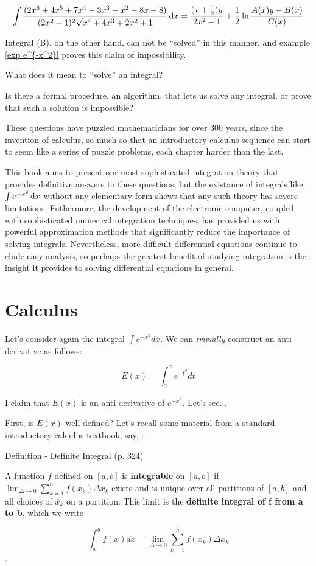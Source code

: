 $$\int {{(2x^6+4x^5+7x^4-3x^3-x^2-8x-8)}\over{(2x^2-1)^2\sqrt{x^4+4 x^3+2 x^2+1}}} \,{\rm d}x
= {{(x+{1\over2})y}\over{2x^2-1}} + {1\over2}\ln{{A(x)y - B(x)}\over{C(x)}}
$$

Integral (B), on the other hand, can not be ``solved'' in
this manner, and example \ref{exp e^{-x^2}} proves this
claim of impossibility.

What does it mean to ``solve'' an integral?

Is there a formal procedure, an algorithm, that lets us solve
any integral, or prove that such a solution is impossible?

These questions have puzzled mathematicians for over 300 years, since
the invention of calculus, so much so that an introductory calculus
sequence can start to seem like a series of puzzle problems, each
chapter harder than the last.

This book aims to present our most sophisticated integration theory
that provides definitive answers to these questions, but the existance
of integrals like $\int e^{-x^2} \,\mathrm{d} x$ without any elementary form shows that any such theory has
severe limitations.  Futhermore, the development of the electronic
computer, coupled with sophisticated numerical integration techniques,
has provided us with powerful approximation methods that significantly
reduce the importance of solving integrals.  Nevertheless, more
difficult differential equations continue to elude easy analysis, so
perhaps the greatest benefit of studying integration is the insight it
provides to solving differential equations in general.

\vfill\eject
\section{Calculus}
Let's consider again the integral $\int e^{-x^2} dx$.  We can {\it trivially} construct
an anti-derivative as follows:

$$E(x) = \int_0^x e^{-t^2} dt$$

I claim that $E(x)$ is an anti-derivative of $e^{-x^2}$.  Let's see...

First, is $E(x)$ well defined?  Let's recall some material from a standard
introductory calculus textbook, say, \cite{briggs}:

\begin{framed}
\cite{briggs} Definition - Definite Integral (p. 324)

A function $f$ defined on $[a,b]$ is {\bf integrable} on $[a,b]$ if $\lim_{\Delta\to0}\sum_{k=1}^{n}f(\bar{x}_k)\Delta x_k$
exists and is unique over all partitions of $[a,b]$ and all choices of $\bar{x}_k$ on a partition.
This limit is the {\bf definite integral of f from a to b}, which we write

$$\int_a^b f(x) dx = \lim_{\Delta\to0}\sum_{k=1}^{n}f(\bar{x}_k)\Delta x_k $$.
\end{framed}

